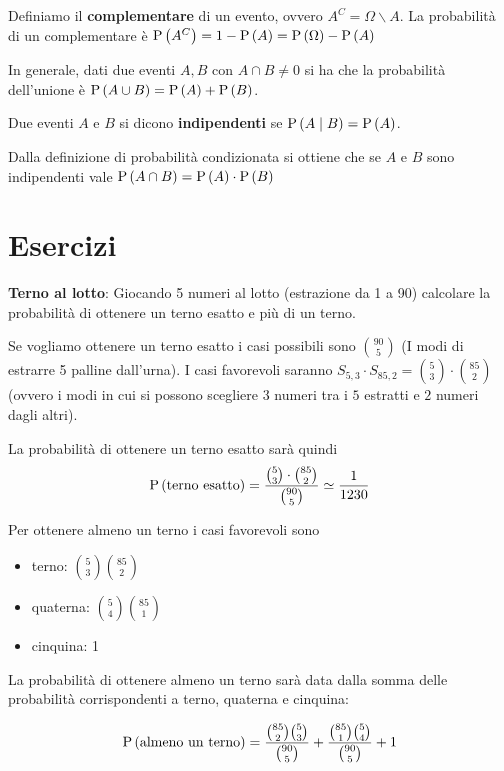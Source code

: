 \begin{defn}
    Definiamo il \textbf{complementare} di un evento, ovvero $ A^C=\Omega \backslash A $. La probabilit\`a di un complementare \`e $ \text{P}\left(A^C\right) = 1 - \text{P}\left(A\right) = \text{P}\left(\Omega\right) - \text{P}\left(A\right) $
\end{defn}
In generale, dati due eventi $ A, B $ con $ A \cap B \neq 0 $ si ha che la probabilit\`a dell'unione \`e $ \text{P}\left(A \cup B\right) = \text{P}\left(A\right) + \text{P}\left(B\right) $.


\begin{defn}
Due eventi $A$ e $B$ si dicono  \textbf{indipendenti} se $\text{P}\left(A \mid B\right)=\text{P}\left(A\right)$.
\end{defn}

Dalla definizione di probabilit\`a condizionata si ottiene che se $A$ e $B$ sono indipendenti vale
 $ \text{P}\left(A \cap B\right) = \text{P}\left(A\right) \cdot \text{P}\left(B\right) $


\section{Esercizi}

\begin{exrc}
    \textbf{Terno al lotto}: Giocando 5 numeri al lotto (estrazione da 1 a 90) calcolare la probabilit\`a di ottenere un terno esatto e pi\`u di un terno.
    
    Se vogliamo ottenere un terno esatto i casi possibili sono $ \binom{90}{5} $ (I modi di estrarre 5 palline dall'urna). I casi favorevoli saranno $ S_{5,3} \cdot S_{85,2} = \binom{5}{3} \cdot \binom{85}{2}$
    (ovvero i modi in cui si possono scegliere $3$ numeri tra i $5$ estratti e $2$ numeri dagli altri).

    La probabilit\`a di ottenere un terno esatto sar\`a quindi
    \begin{equation*}
        \text{P}\left(\text{terno esatto}\right) = \dfrac{\binom{5}{3} \cdot \binom{85}{2}}{\binom{90}{5}} \simeq \frac 1{1230}
    \end{equation*}


    Per ottenere almeno un terno i casi favorevoli sono
    \begin{itemize}
        \item terno: $ \binom{5}{3} \binom{85}{2} $
        \item quaterna: $ \binom{5}{4} \binom{85}{1} $
        \item cinquina: 1
    \end{itemize}
    
    La probabilit\`a di ottenere almeno un terno sar\`a data dalla somma delle probabilit\`a corrispondenti a terno, quaterna e cinquina:
    
    \begin{equation*}
        \text{P}\left(\text{almeno un terno}\right) = \dfrac{\binom{85}{2} \binom{5}{3}}{\binom{90}{5}} + \dfrac{\binom{85}{1} \binom{5}{4}}{\binom{90}{5}} + 1
    \end{equation*}
\end{exrc}

